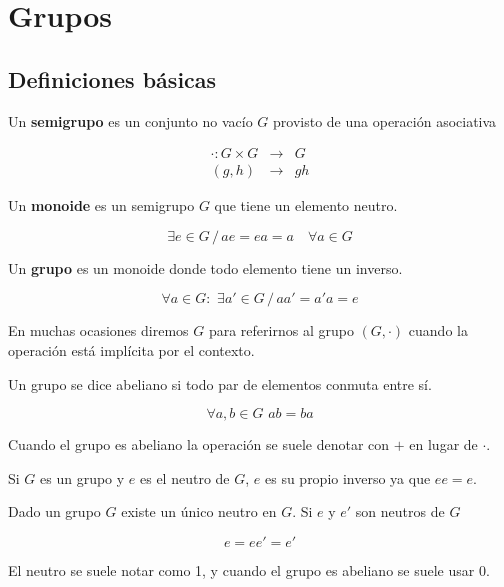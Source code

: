 \section{Grupos}
\subsection{Definiciones b\'asicas}
\begin{defn}
Un {\bf semigrupo} es un conjunto no vac\'io $G$ provisto de una operaci\'on asociativa

\begin{eqnarray*}
\cdot : G \times G &\rightarrow& G\\
(g,h) &\rightarrow& gh
\end{eqnarray*}
\end{defn}
\begin{defn}
Un {\bf monoide} es un semigrupo $G$ que tiene un elemento neutro.

$$\exists e \in G \, / \,ae = ea = a \quad \forall a \in G$$
\end{defn}

\begin{defn}
Un {\bf grupo} es un monoide donde todo elemento tiene un inverso.

$$\forall a \in G: \,\, \exists a' \in G \, / \, aa' = a'a = e$$
\end{defn}

En muchas ocasiones diremos $G$ para referirnos al grupo $(G,\cdot)$ cuando la operaci\'on est\'a impl\'icita por el contexto.

\begin{defn}
Un grupo se dice abeliano si todo par de elementos conmuta entre s\'i.

$$\forall a,b \in G \,\, ab = ba$$

\noindent Cuando el grupo es abeliano la operaci\'on se suele denotar con $+$ en lugar de $\cdot$.
\end{defn}

\begin{obs}
Si $G$ es un grupo y $e$ es el neutro de $G$, $e$ es su propio inverso ya que $ee = e$.
\end{obs}

\begin{obs}
Dado un grupo $G$ existe un \'unico neutro en $G$. Si $e$ y $e'$ son neutros de $G$

$$e = ee' = e'$$

\noindent El neutro se suele notar como 1, y cuando el grupo es abeliano se suele usar 0.
\end{obs}

